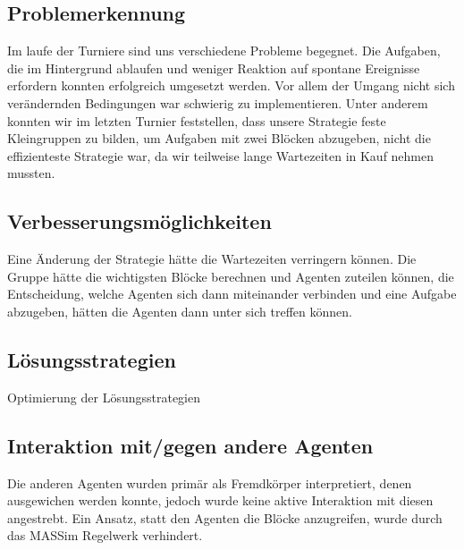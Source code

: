 \subsection{Problemerkennung}
Im laufe der Turniere sind uns verschiedene Probleme begegnet. Die Aufgaben, die im Hintergrund ablaufen und weniger Reaktion auf spontane Ereignisse erfordern konnten erfolgreich umgesetzt werden. Vor allem der Umgang nicht sich verändernden Bedingungen war schwierig zu implementieren. Unter anderem konnten wir im letzten Turnier feststellen, dass unsere Strategie feste Kleingruppen zu bilden, um Aufgaben mit zwei Blöcken abzugeben, nicht die effizienteste Strategie war, da wir teilweise lange Wartezeiten in Kauf nehmen mussten.

\subsection{Verbesserungsmöglichkeiten}
Eine Änderung der Strategie hätte die Wartezeiten verringern können. Die Gruppe hätte die wichtigsten Blöcke berechnen und Agenten zuteilen können, die Entscheidung, welche Agenten sich dann miteinander verbinden und eine Aufgabe abzugeben, hätten die Agenten dann unter sich treffen können.

\subsection{Lösungsstrategien}
Optimierung der Lösungsstrategien

\subsection{Interaktion mit/gegen andere Agenten}
Die anderen Agenten wurden primär als Fremdkörper interpretiert, denen ausgewichen werden konnte, jedoch wurde keine aktive Interaktion mit diesen angestrebt. Ein Ansatz, statt den Agenten die Blöcke anzugreifen, wurde durch das MASSim Regelwerk verhindert. 
